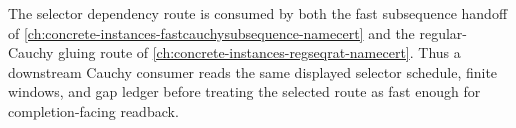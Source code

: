 The selector dependency route is consumed by both the fast subsequence handoff of \autoref{ch:concrete-instances-fastcauchysubsequence-namecert} and the regular-Cauchy gluing route of \autoref{ch:concrete-instances-regseqrat-namecert}. Thus a downstream Cauchy consumer reads the same displayed selector schedule, finite windows, and gap ledger before treating the selected route as fast enough for completion-facing readback.

